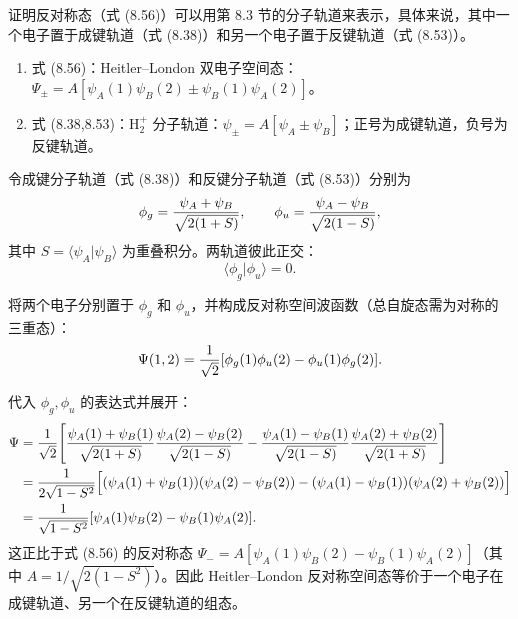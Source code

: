 \begin{question}
证明反对称态（式 (8.56)）可以用第 8.3 节的分子轨道来表示，具体来说，其中一个电子置于成键轨道（式 (8.38)）和另一个电子置于反键轨道（式 (8.53)）。

\par\smallskip
{}
\begin{enumerate}[leftmargin=2.2em,itemsep=0.12em,topsep=0.12em,parsep=0pt]
\item 式 (8.56)：Heitler--London 双电子空间态：$\Psi_\pm=A[\psi_A(1)\psi_B(2)\pm\psi_B(1)\psi_A(2)]$。
\item 式 (8.38,8.53)：$\mathrm H_2^+$ 分子轨道：$\psi_\pm=A[\psi_A\pm\psi_B]$；正号为成键轨道，负号为反键轨道。
\end{enumerate}

\end{question}
\begin{solution}
令成键分子轨道（式 (8.38)）和反键分子轨道（式 (8.53)）分别为
\[
\phi_g={\psi_A+\psi_B\over\sqrt{2(1+S)}},\qquad
\phi_u={\psi_A-\psi_B\over\sqrt{2(1-S)}},
\]
其中 $S=\langle\psi_A|\psi_B\rangle$ 为重叠积分。两轨道彼此正交：
\[
\langle\phi_g|\phi_u\rangle=0.
\]

将两个电子分别置于 $\phi_g$ 和 $\phi_u$，并构成反对称空间波函数（总自旋态需为对称的三重态）：
\[
\Psi(1,2)={1\over\sqrt2}[\phi_g(1)\phi_u(2)-\phi_u(1)\phi_g(2)].
\]

代入 $\phi_g,\phi_u$ 的表达式并展开：
\[
\begin{aligned}
\Psi&={1\over\sqrt2}\Bigg[
{\psi_A(1)+\psi_B(1)\over\sqrt{2(1+S)}}{\psi_A(2)-\psi_B(2)\over\sqrt{2(1-S)}}
-{\psi_A(1)-\psi_B(1)\over\sqrt{2(1-S)}}{\psi_A(2)+\psi_B(2)\over\sqrt{2(1+S)}}\Bigg]\\
&={1\over2\sqrt{1-S^2}}\Bigl[
(\psi_A(1)+\psi_B(1))(\psi_A(2)-\psi_B(2))
-(\psi_A(1)-\psi_B(1))(\psi_A(2)+\psi_B(2))\Bigr]\\
&={1\over\sqrt{1-S^2}}[\psi_A(1)\psi_B(2)-\psi_B(1)\psi_A(2)].
\end{aligned}
\]
这正比于式 (8.56) 的反对称态 $\Psi_-=A[\psi_A(1)\psi_B(2)-\psi_B(1)\psi_A(2)]$（其中 $A=1/\sqrt{2(1-S^2)}$）。因此 Heitler--London 反对称空间态等价于一个电子在成键轨道、另一个在反键轨道的组态。
\end{solution}

